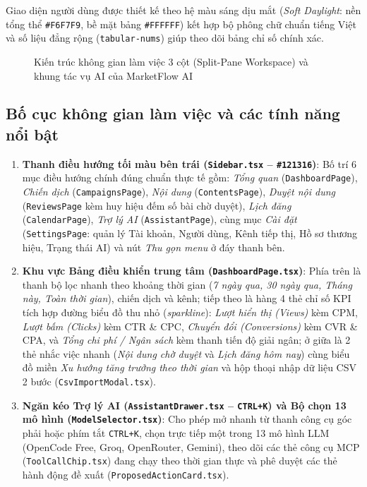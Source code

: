 Giao diện người dùng được thiết kế theo hệ màu sáng dịu mắt (\textit{Soft Daylight}: nền tổng thể \texttt{\#F6F7F9}, bề mặt bảng \texttt{\#FFFFFF}) kết hợp bộ phông chữ chuẩn tiếng Việt và số liệu đẳng rộng (\texttt{tabular-nums}) giúp theo dõi bảng chỉ số chính xác.

\begin{figure}[!htbp]
\centering

\caption{Kiến trúc không gian làm việc 3 cột (Split-Pane Workspace) và khung tác vụ AI của MarketFlow AI}
\label{fig:ui-wireframe}
\end{figure}

\subsection{Bố cục không gian làm việc và các tính năng nổi bật}
\begin{enumerate}
 \item \textbf{Thanh điều hướng tối màu bên trái (\texttt{Sidebar.tsx} -- \texttt{\#121316})}: Bố trí 6 mục điều hướng chính đúng chuẩn thực tế gồm: \textit{Tổng quan} (\texttt{DashboardPage}), \textit{Chiến dịch} (\texttt{CampaignsPage}), \textit{Nội dung} (\texttt{ContentsPage}), \textit{Duyệt nội dung} (\texttt{ReviewsPage} kèm huy hiệu đếm số bài chờ duyệt), \textit{Lịch đăng} (\texttt{CalendarPage}), \textit{Trợ lý AI} (\texttt{AssistantPage}), cùng mục \textit{Cài đặt} (\texttt{SettingsPage}: quản lý Tài khoản, Người dùng, Kênh tiếp thị, Hồ sơ thương hiệu, Trạng thái AI) và nút \textit{Thu gọn menu} ở đáy thanh bên.
 \item \textbf{Khu vực Bảng điều khiển trung tâm (\texttt{DashboardPage.tsx})}: Phía trên là thanh bộ lọc nhanh theo khoảng thời gian (\textit{7 ngày qua, 30 ngày qua, Tháng này, Toàn thời gian}), chiến dịch và kênh; tiếp theo là hàng 4 thẻ chỉ số KPI tích hợp đường biểu đồ thu nhỏ (\textit{sparkline}): \textit{Lượt hiển thị (Views)} kèm CPM, \textit{Lượt bấm (Clicks)} kèm CTR \& CPC, \textit{Chuyển đổi (Conversions)} kèm CVR \& CPA, và \textit{Tổng chi phí / Ngân sách} kèm thanh tiến độ giải ngân; ở giữa là 2 thẻ nhắc việc nhanh (\textit{Nội dung chờ duyệt} và \textit{Lịch đăng hôm nay}) cùng biểu đồ miền \textit{Xu hướng tăng trưởng theo thời gian} và hộp thoại nhập dữ liệu CSV 2 bước (\texttt{CsvImportModal.tsx}).
 \item \textbf{Ngăn kéo Trợ lý AI (\texttt{AssistantDrawer.tsx} -- \texttt{CTRL+K}) và Bộ chọn 13 mô hình (\texttt{ModelSelector.tsx})}: Cho phép mở nhanh từ thanh công cụ góc phải hoặc phím tắt \texttt{CTRL+K}, chọn trực tiếp một trong 13 mô hình LLM (OpenCode Free, Groq, OpenRouter, Gemini), theo dõi các thẻ công cụ MCP (\texttt{ToolCallChip.tsx}) đang chạy theo thời gian thực và phê duyệt các thẻ hành động đề xuất (\texttt{ProposedActionCard.tsx}).
\end{enumerate}

